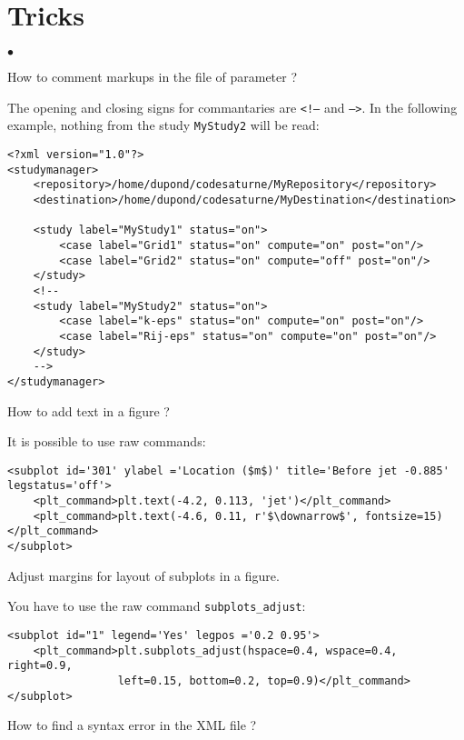\documentclass[a4paper,10pt,twoside]{csshortdoc}
\begin{document}
\section{Tricks}\label{sec:tricks}
\begin{list}{$\bullet$}{}
\item How to comment markups in the file of parameter ?

The opening and closing signs for commantaries are \texttt{<!--} and
\texttt{-->}. In the following example, nothing from the study
\texttt{MyStudy2} will be read:
\small
\begin{verbatim}
<?xml version="1.0"?>
<studymanager>
    <repository>/home/dupond/codesaturne/MyRepository</repository>
    <destination>/home/dupond/codesaturne/MyDestination</destination>

    <study label="MyStudy1" status="on">
        <case label="Grid1" status="on" compute="on" post="on"/>
        <case label="Grid2" status="on" compute="off" post="on"/>
    </study>
    <!--
    <study label="MyStudy2" status="on">
        <case label="k-eps" status="on" compute="on" post="on"/>
        <case label="Rij-eps" status="on" compute="on" post="on"/>
    </study>
    -->
</studymanager>
\end{verbatim}
\normalsize

\item How to add text in a figure ?

It is possible to use raw commands:
\small
\begin{verbatim}
<subplot id='301' ylabel ='Location ($m$)' title='Before jet -0.885' legstatus='off'>
    <plt_command>plt.text(-4.2, 0.113, 'jet')</plt_command>
    <plt_command>plt.text(-4.6, 0.11, r'$\downarrow$', fontsize=15)</plt_command>
</subplot>
 \end{verbatim}
\normalsize

\item Adjust margins for layout of subplots in a figure.

You have to use the raw command \texttt{subplots\_adjust}:

\small
\begin{verbatim}
<subplot id="1" legend='Yes' legpos ='0.2 0.95'>
    <plt_command>plt.subplots_adjust(hspace=0.4, wspace=0.4, right=0.9,
                 left=0.15, bottom=0.2, top=0.9)</plt_command>
</subplot>
\end{verbatim}
\normalsize

\item How to find a syntax error in the XML file ?


\end{list}
\end{document}
